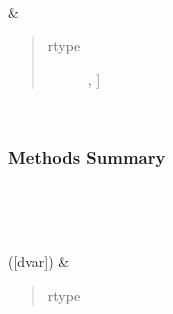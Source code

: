 \documentclass[letterpaper,10pt,english]{sphinxmanual}
\begin{document}
\begin{fulllineitems}
\begin{savenotes}
\begin{longtable}[c]{}
\begin{quote}
\begin{description}
\end{description}\end{quote}

\\
\hline
\sphinxAtStartPar
{\hyperref[\detokenize{api/seyfert.cosmology.parameter.PhysicalParametersCollection:seyfert.cosmology.parameter.PhysicalParametersCollection.params}]{}}
&
\sphinxAtStartPar
\begin{quote}\begin{description}
\item[{rtype}] \leavevmode
\sphinxAtStartPar
\sphinxcode{\sphinxupquote{Dict}}{[}, {\hyperref[\detokenize{api/seyfert.cosmology.parameter.PhysicalParameter:seyfert.cosmology.parameter.PhysicalParameter}]{}}{]}

\end{description}\end{quote}

\\
\hline
\end{longtable}\sphinxatlongtableend\end{savenotes}
\subsubsection*{Methods Summary}


\begin{savenotes}\sphinxatlongtablestart\begin{longtable}[c]{}
\hline

\endfirsthead

%
{}\\
\hline

\endhead

\hline
{}\\
\endfoot

\endlastfoot

\sphinxAtStartPar
{\hyperref[\detokenize{api/seyfert.cosmology.parameter.PhysicalParametersCollection:seyfert.cosmology.parameter.PhysicalParametersCollection.computePhysParSTEMValues}]{}}({[}dvar{]})
&
\sphinxAtStartPar
\begin{quote}\begin{description}
\item[{rtype}] \leavevmode
\sphinxAtStartPar
{}


\end{description}
\end{quote}
\end{longtable}
\end{savenotes}
\end{fulllineitems}
\end{document}

